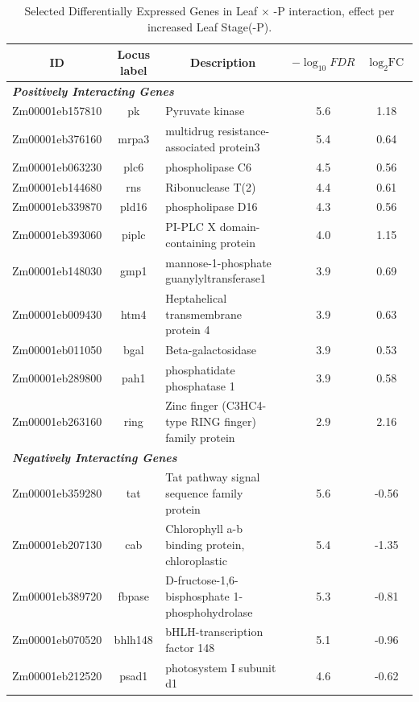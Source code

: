 \documentclass[9pt,twocolumn,twoside]{rilabRxiv}
\begin{document}
\begin{table}[h!]
\centering
\footnotesize %
\caption{Selected Differentially Expressed Genes in Leaf $\times$ -P interaction, effect per increased Leaf Stage($\text{-P}$).}
\label{table::leafxpDEGs}
\begin{tabular}{ccp{7.5cm}cc} %
\hline
\textbf{ID} & \textbf{Locus label} & \multicolumn{1}{c}{\textbf{Description}} &   \textbf{$-\log_{10}{\textit{FDR}}$} & \textbf{$\log_2{\text{FC}}$}\\
\hline
\multicolumn{5}{l}{\textit{\textbf{Positively Interacting Genes}}} \\
\hline
Zm00001eb157810 & pk & Pyruvate kinase & 5.6 & 1.18\\
Zm00001eb376160 & mrpa3 & multidrug resistance-associated protein3 & 5.4 & 0.64\\
Zm00001eb063230 & plc6 & phospholipase C6 & 4.5 & 0.56\\
Zm00001eb144680 & rns & Ribonuclease T(2) & 4.4 & 0.61\\
Zm00001eb339870 & pld16 & phospholipase D16 & 4.3 & 0.56\\
Zm00001eb393060 & piplc & PI-PLC X domain-containing protein & 4.0 & 1.15\\
Zm00001eb148030 & gmp1 & mannose-1-phosphate guanylyltransferase1 & 3.9 & 0.69\\
Zm00001eb009430 & htm4 & Heptahelical transmembrane protein 4 & 3.9 & 0.63\\
Zm00001eb011050 & bgal & Beta-galactosidase & 3.9 & 0.53\\
Zm00001eb289800 & pah1 & phosphatidate phosphatase 1 & 3.9 & 0.58\\
Zm00001eb263160 & ring & Zinc finger (C3HC4-type RING finger) family protein & 2.9 & 2.16\\
\hline
\multicolumn{5}{l}{\textit{\textbf{Negatively Interacting  Genes}}} \\
\hline
Zm00001eb359280 & tat & Tat pathway signal sequence family protein & 5.6 & -0.56\\
Zm00001eb207130 & cab & Chlorophyll a-b binding protein, chloroplastic & 5.4 & -1.35\\
Zm00001eb389720 & fbpase & D-fructose-1,6-bisphosphate 1-phosphohydrolase & 5.3 & -0.81\\
Zm00001eb070520 & bhlh148 & bHLH-transcription factor 148 & 5.1 & -0.96\\
Zm00001eb212520 & psad1 & photosystem I subunit d1 & 4.6 & -0.62\\

\end{tabular}
\end{table}
\end{document}
